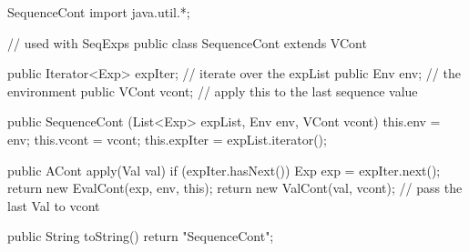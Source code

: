 \begin{minipage}[t]{\sw}
\slidenumber
\large
\begin{qv}
SequenceCont
import java.util.*;

// used with SeqExps
public class SequenceCont extends VCont {

    public Iterator<Exp> expIter; // iterate over the expList
    public Env env;               // the environment
    public VCont vcont;           // apply this to the last sequence value

    public SequenceCont (List<Exp> expList, Env env, VCont vcont) {
        this.env = env;
        this.vcont = vcont;
        this.expIter = expList.iterator();
    }

    public ACont apply(Val val) {
        if (expIter.hasNext()) {
            Exp exp = expIter.next();
            return new EvalCont(exp, env, this);
        }
        return new ValCont(val, vcont); // pass the last Val to vcont
    }

    public String toString() {
        return "SequenceCont";
    }
}
\end{qv}
\end{minipage}
